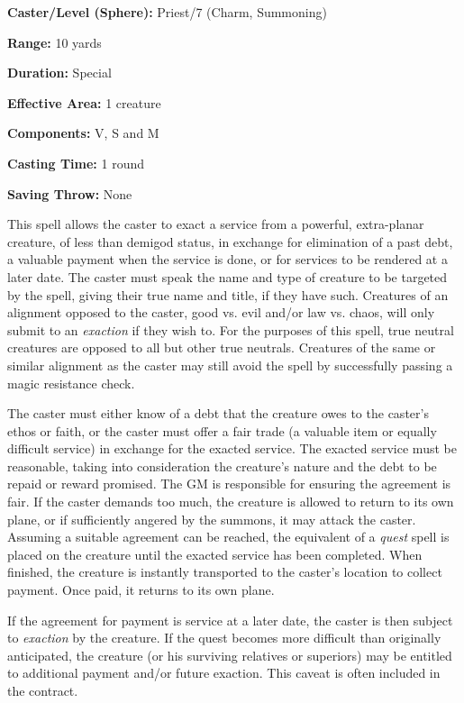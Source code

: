 \begin{multicols}{2}
\begin{minipage}{\columnwidth}
\noindent \textbf{Caster/Level (Sphere):} Priest/7 (Charm, Summoning)

\noindent \textbf{Range:} 10 yards

\noindent \textbf{Duration:} Special

\noindent \textbf{Effective Area:} 1 creature

\noindent \textbf{Components:} V, S and M

\noindent \textbf{Casting Time:} 1 round

\noindent \textbf{Saving Throw:} None

\end{minipage}

This spell allows the caster to exact a service from a powerful, extra-planar creature, of less than demigod status, in exchange for elimination of a past debt, a valuable payment when the service is done, or for services to be rendered at a later date.  The caster must speak the name and type of creature to be targeted by the spell, giving their true name and title, if they have such.  Creatures of an alignment opposed to the caster, good vs. evil and/or law vs. chaos, will only submit to an \textit{exaction} if they wish to.  For the purposes of this spell, true neutral creatures are opposed to all but other true neutrals.  Creatures of the same or similar alignment as the caster may still avoid the spell by successfully passing a magic resistance check.

The caster must either know of a debt that the creature owes to the caster's ethos or faith, or the caster must offer a fair trade (a valuable item or equally difficult service) in exchange for the exacted service.  The exacted service must be reasonable, taking into consideration the creature's nature and the debt to be repaid or reward promised.  The GM is responsible for ensuring the agreement is fair.  If the caster demands too much, the creature is allowed to return to its own plane, or if sufficiently angered by the summons, it may attack the caster.  Assuming a suitable agreement can be reached, the equivalent of a \textit{quest} spell is placed on the creature until the exacted service has been completed.  When finished, the creature is instantly transported to the caster's location to collect payment.  Once paid, it returns to its own plane.  

If the agreement for payment is service at a later date, the caster is then subject to \textit{exaction} by the creature.  If the quest becomes more difficult than originally anticipated, the creature (or his surviving relatives or superiors) may be entitled to additional payment and/or future exaction.  This caveat is often included in the contract.


\end{multicols}

